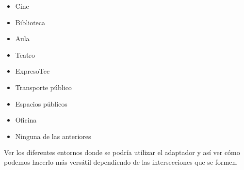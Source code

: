 
\begin{itemize}
    \item Cine
    \item Biblioteca
    \item Aula
    \item Teatro
    \item ExpresoTec
    \item Transporte público
    \item Espacios públicos
    \item Oficina
    \item Ninguna de las anteriores
\end{itemize}

Ver los diferentes entornos donde se podría utilizar el adaptador y así ver cómo podemos hacerlo más versátil dependiendo de las intersecciones que se formen.